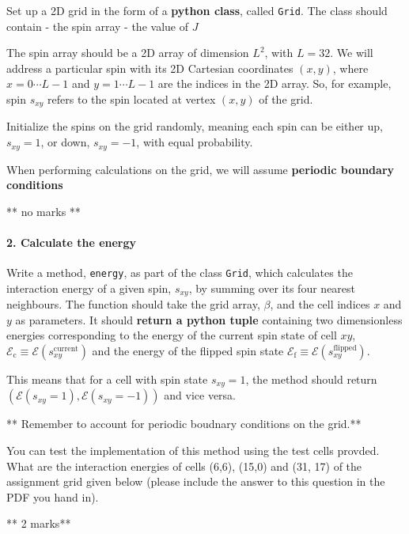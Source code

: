 \documentclass[11pt]{article}
\begin{document}
Set up a 2D grid in the form of a \textbf{python class}, called
\texttt{Grid}. The class should contain - the spin array - the value of
\(J\)

The spin array should be a 2D array of dimension \(L^2\), with \(L=32\).
We will address a particular spin with its 2D Cartesian coordinates
\((x,y)\), where \(x=0\cdots L-1\) and \(y=1\cdots L-1\) are the indices
in the 2D array. So, for example, spin \(s_{xy}\) refers to the spin
located at vertex \((x,y)\) of the grid.

Initialize the spins on the grid randomly, meaning each spin can be
either up, \(s_{xy}=1\), or down, \(s_{xy}=-1\), with equal probability.

When performing calculations on the grid, we will assume
\textbf{periodic boundary conditions}

** no marks **

    \hypertarget{calculate-the-energy}{%
\paragraph{2. Calculate the energy}\label{calculate-the-energy}}

Write a method, \texttt{energy}, as part of the class \texttt{Grid},
which calculates the interaction energy of a given spin, \(s_{xy}\), by
summing over its four nearest neighbours. The function should take the
grid array, \(\beta\), and the cell indices \(x\) and \(y\) as
parameters. It should \textbf{return a python tuple} containing two
dimensionless energies corresponding to the energy of the current spin
state of cell \(xy\),
\(\mathcal{E}_\mathrm{c} \equiv \mathcal{E}\left(s_{xy}^\mathrm{current}\right)\)
and the energy of the flipped spin state
\(\mathcal{E}_\mathrm{f} \equiv \mathcal{E}\left(s_{xy}^\mathrm{flipped}\right)\).

This means that for a cell with spin state \(s_{xy} = 1\), the method
should return
\(\left(\mathcal{E}\left(s_{xy} = 1\right), \mathcal{E}\left(s_{xy} = -1\right)\right)\)
and vice versa.

** Remember to account for periodic boudnary conditions on the grid.**

You can test the implementation of this method using the test cells
provded. What are the interaction energies of cells (6,6), (15,0) and
(31, 17) of the assignment grid given below (please include the answer
to this question in the PDF you hand in).

** 2 marks**
\end{document}
